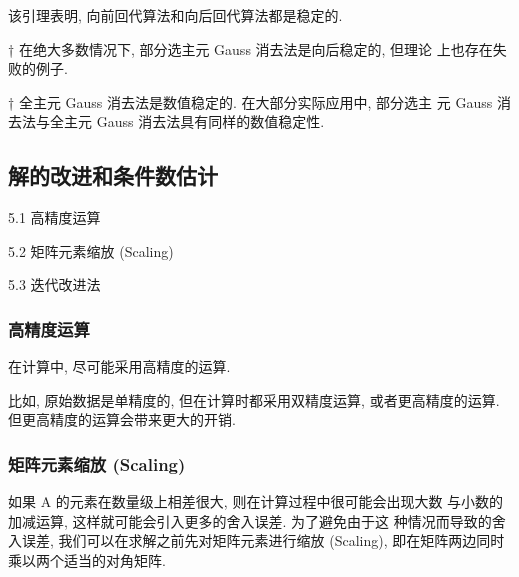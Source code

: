 \documentclass[12pt,a4paper]{article}
\begin{document}
该引理表明, 向前回代算法和向后回代算法都是稳定的.

\begin{framed}
	† 在绝大多数情况下, 部分选主元 Gauss 消去法是向后稳定的, 但理论
	上也存在失败的例子.
\end{framed}

\begin{framed}
	† 全主元 Gauss 消去法是数值稳定的. 在大部分实际应用中, 部分选主
	元 Gauss 消去法与全主元 Gauss 消去法具有同样的数值稳定性.
\end{framed}

\subsection{解的改进和条件数估计}

5.1 高精度运算

5.2 矩阵元素缩放 (Scaling)

5.3 迭代改进法

\subsubsection{高精度运算}
在计算中, 尽可能采用高精度的运算.

比如, 原始数据是单精度的, 但在计算时都采用双精度运算, 或者更高精度的运算. 但更高精度的运算会带来更大的开销.

\subsubsection{矩阵元素缩放 (Scaling)}
如果 A 的元素在数量级上相差很大, 则在计算过程中很可能会出现大数
与小数的加减运算, 这样就可能会引入更多的舍入误差. 为了避免由于这
种情况而导致的舍入误差, 我们可以在求解之前先对矩阵元素进行缩放
(Scaling), 即在矩阵两边同时乘以两个适当的对角矩阵.
\end{document}
